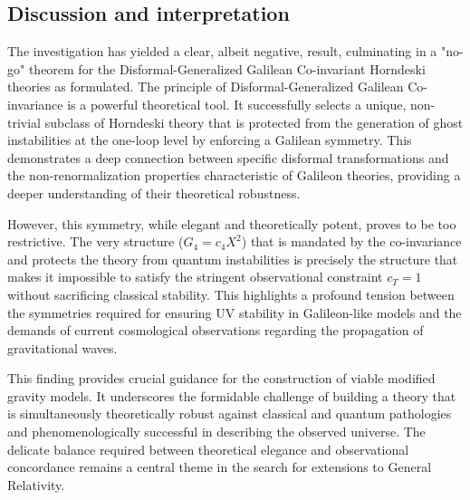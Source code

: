 \documentclass[twocolumn]{aastex631}
\begin{document}
\subsection{Discussion and interpretation}
The investigation has yielded a clear, albeit negative, result, culminating in a "no-go" theorem for the Disformal-Generalized Galilean Co-invariant Horndeski theories as formulated. The principle of Disformal-Generalized Galilean Co-invariance is a powerful theoretical tool. It successfully selects a unique, non-trivial subclass of Horndeski theory that is protected from the generation of ghost instabilities at the one-loop level by enforcing a Galilean symmetry. This demonstrates a deep connection between specific disformal transformations and the non-renormalization properties characteristic of Galileon theories, providing a deeper understanding of their theoretical robustness.

However, this symmetry, while elegant and theoretically potent, proves to be too restrictive. The very structure ($G_4 = c_4 X^2$) that is mandated by the co-invariance and protects the theory from quantum instabilities is precisely the structure that makes it impossible to satisfy the stringent observational constraint $c_T = 1$ without sacrificing classical stability. This highlights a profound tension between the symmetries required for ensuring UV stability in Galileon-like models and the demands of current cosmological observations regarding the propagation of gravitational waves.

This finding provides crucial guidance for the construction of viable modified gravity models. It underscores the formidable challenge of building a theory that is simultaneously theoretically robust against classical and quantum pathologies and phenomenologically successful in describing the observed universe. The delicate balance required between theoretical elegance and observational concordance remains a central theme in the search for extensions to General Relativity.
\end{document}
